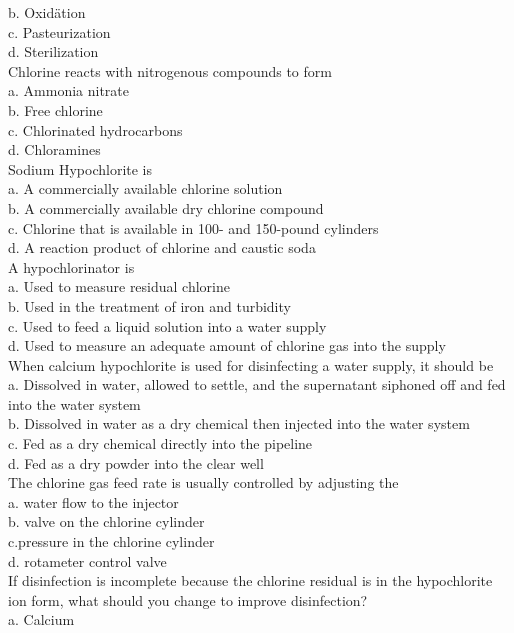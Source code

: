 b. Oxidätion\\
c. Pasteurization\\
d. Sterilization\\
Chlorine reacts with nitrogenous compounds to form\\
a. Ammonia nitrate\\
b. Free chlorine\\
c. Chlorinated hydrocarbons\\
d. Chloramines\\
  Sodium Hypochlorite is\\
a. A commercially available chlorine solution\\
b. A commercially available dry chlorine compound\\
c. Chlorine that is available in 100- and 150-pound cylinders\\
d. A reaction product of chlorine and caustic soda\\
A hypochlorinator is\\
a. Used to measure residual chlorine\\
b. Used in the treatment of iron and turbidity\\
c. Used to feed a liquid solution into a water supply\\
d. Used to measure an adequate amount of chlorine gas into the supply\\
  When calcium hypochlorite is used for disinfecting a water supply, it should be\\
a.	 Dissolved in water, allowed to settle, and the supernatant siphoned off and fed into the water system\\
b. Dissolved in water as a dry chemical then injected into the water system\\
c. Fed as a dry chemical directly into the pipeline\\
d. Fed as a dry powder into the clear well\\
The chlorine gas feed rate is usually controlled by adjusting the\\
a. water flow to the injector\\
b. valve on the chlorine cylinder\\
c.pressure in the chlorine cylinder\\
d. rotameter control valve\\
If disinfection is incomplete because the chlorine residual is in the hypochlorite ion form, what should you change to improve disinfection?\\
a. Calcium\\
